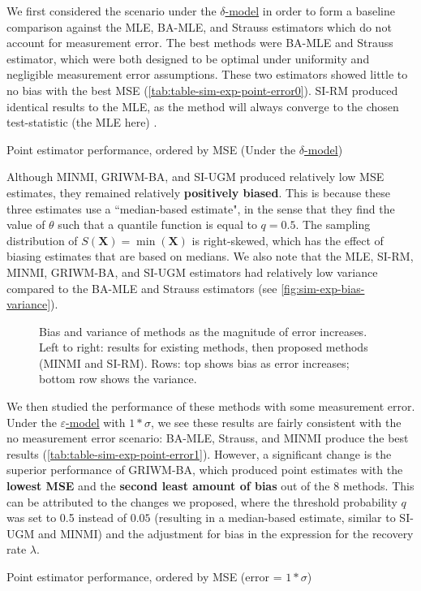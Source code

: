 We first considered the scenario under the \hyperref[model: no-measurement-error]{$\delta$-model} in order to form a baseline comparison against the MLE, BA-MLE, and Strauss estimators which do not account for measurement error. The best methods were BA-MLE and Strauss estimator, which were both designed to be optimal under uniformity and negligible measurement error assumptions. These two estimators showed little to no bias with the best MSE (\autoref{tab:table-sim-exp-point-error0}). SI-RM produced identical results to the MLE, as the method will always converge to the chosen test-statistic (the MLE here) \cite{Garthwaite1992}.
\begin{table}[ht]
    \centering
    \caption{Point estimator performance, ordered by MSE (Under the \hyperref[model: no-measurement-error]{$\delta$-model})}
    
    \label{tab:table-sim-exp-point-error0}
\end{table}

Although MINMI, GRIWM-BA, and SI-UGM produced relatively low MSE estimates, they remained relatively \textbf{positively biased}. This is because these three estimates use a ``median-based estimate", in the sense that they find the value of $\theta$ such that a quantile function is equal to $q = 0.5$. The sampling distribution of $S(\bm{X}) = \min(\bm{X})$ is right-skewed, which has the effect of biasing estimates that are based on medians. We also note that the MLE, SI-RM, MINMI, GRIWM-BA, and SI-UGM estimators had relatively low variance compared to the BA-MLE and Strauss estimators (see \autoref{fig:sim-exp-bias-variance}).
\begin{figure}[ht]
    \centering
    
    \caption{Bias and variance of methods as the magnitude of error increases. Left to right: results for existing methods, then proposed methods (MINMI and SI-RM). Rows: top shows bias as error increases; bottom row shows the variance.}
    \label{fig:sim-exp-bias-variance}
\end{figure}

We then studied the performance of these methods with some measurement error. Under the  \hyperref[model: measurement-error]{$\varepsilon$-model} with $1*\sigma$, we see these results are fairly consistent with the no measurement error scenario: BA-MLE, Strauss, and MINMI produce the best results (\autoref{tab:table-sim-exp-point-error1}). However, a significant change is the superior performance of GRIWM-BA, which produced point estimates with the \textbf{lowest MSE} and the \textbf{second least amount of bias} out of the 8 methods. This can be attributed to the changes we proposed, where the threshold probability $q$ was set to 0.5 instead of $0.05$ (resulting in a median-based estimate, similar to SI-UGM and MINMI) and the adjustment for bias in the expression for the recovery rate $\lambda$.
\begin{table}[ht]
    \centering
    \caption{Point estimator performance, ordered by MSE (error = $1*\sigma$)}
    
    \label{tab:table-sim-exp-point-error1}
\end{table}

